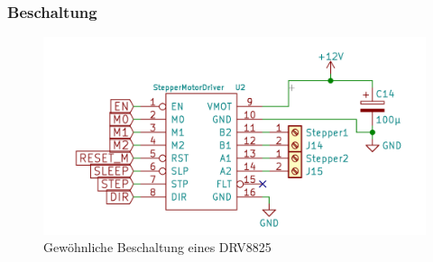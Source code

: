 \subsubsection{Beschaltung}
\begin{figure}[h]
    \centering
    \includegraphics[scale=0.5,page=1]{fig/elektro/StepperMotorDriver.pdf}
    \caption{Gewöhnliche Beschaltung eines DRV8825}
\end{figure}


